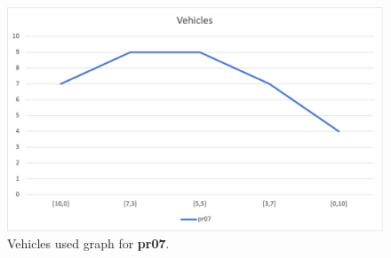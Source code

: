 \begin{figure}[H]
    \centering
    \includegraphics[height=0.25\textheight]{../graphs/pr07-vehicles.png}
    \caption{Vehicles used graph for \textbf{pr07}.}
\end{figure}

\newpage

